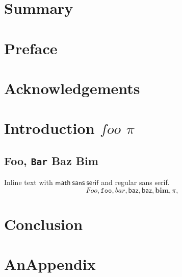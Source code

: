 \prefrontmatter
\maketitle
\makecolophon

\frontmatter
\chapter{Summary}
\lipsum[1]
\cite{adams1980hitchhiker}
\chapter{Preface}
\chapter{Acknowledgements}
\clearforchapter
\tableofcontents
\mylistoftodos

\mainmatter
\chapter{Introduction $foo$ $\pi$}
\lipsum[2]

\section{Foo, \texttt{Bar} \textsf{Baz} \textbf{Bim}}
Inline text with $\mathsf{math\ sans\ serif}$ and \textsf{regular sans serif}.
\begin{equation*}
    Foo, \mathtt{foo}, \mathit{bar}, \mathsf{baz}, \textsf{baz}, \mathbf{bim}, \pi, 
\end{equation*}

\chapter{Conclusion}
\lipsum[3]
\blinddocument 

\appendix
\chapter{AnAppendix}
\lipsum[4]


